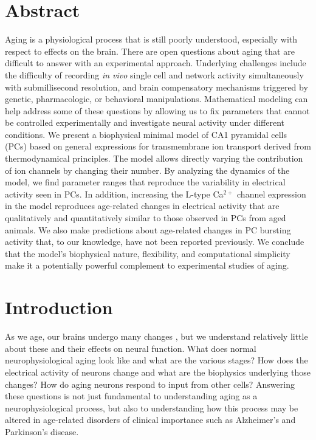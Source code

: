 \documentclass[10pt,letterpaper]{article}
\newcommand{\Ca}{Ca$^{2+}$}
\begin{document}
\section*{Abstract}
Aging is a physiological process that is still poorly understood, especially with respect to effects on the brain. There are open questions about aging that are difficult to answer with an experimental approach. Underlying challenges include  the difficulty of recording \textit{in vivo} single cell and network activity simultaneously with submillisecond  resolution, and brain compensatory mechanisms triggered by genetic, pharmacologic, or behavioral manipulations. Mathematical modeling can help address some of these questions by allowing us to fix parameters that cannot be controlled experimentally and investigate neural activity under different conditions. We present a biophysical minimal model of CA1 pyramidal cells (PCs) based on general expressions for transmembrane ion transport derived from thermodynamical principles. The model allows directly varying the contribution of ion channels by changing their number. By analyzing the dynamics of the model, we find parameter ranges that reproduce the variability in electrical activity seen in PCs. In addition, increasing the L-type {\Ca} channel expression in the model reproduces age-related changes in electrical activity that are qualitatively and quantitatively similar to those observed in PCs from aged animals. We also make predictions about age-related changes in PC bursting activity that, to our knowledge, have not been reported previously. We conclude that the model's biophysical nature, flexibility, and computational simplicity make it a potentially powerful complement to experimental studies of aging.


\linenumbers

\section*{Introduction}
As we age, our brains undergo many changes
\cite{oh2010learning,rosenzweig2003impact}, but we understand relatively little about these and their effects on neural function. What does normal neurophysiological aging look like and what are the various stages? How does the electrical activity of neurons change and what are the biophysics underlying those changes?  How do aging neurons respond to input from other cells? Answering these questions is not just fundamental to understanding aging as a neurophysiological process, but also to understanding how this process may be altered in age-related disorders of clinical importance such as Alzheimer's \cite{fjell2014normal} and Parkinson's \cite{rodriguez2015parkinson} disease.
\end{document}
